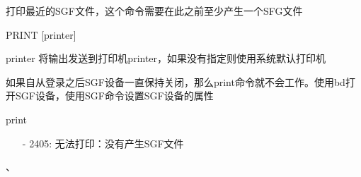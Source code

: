 \label{cmd:print}

打印最近的SGF文件，这个命令需要在此之前至少产生一个SFG文件

\begin{SACSTX}
PRINT [printer]
\end{SACSTX}

printer 将输出发送到打印机printer，如果没有指定则使用系统默认打印机

如果自从登录之后SGF设备一直保持关闭，那么print命令就不会工作。使用bd打开SGF设备，使用SGF命令设置SGF设备的属性

\begin{SACDFT}
print
\end{SACDFT}

\begin{itemize}
\item[-]2405: 无法打印：没有产生SGF文件
\end{itemize}

、
